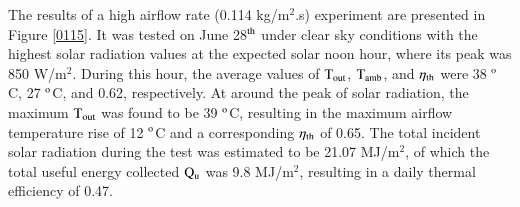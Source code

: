 The results of a high airflow rate (0.114 kg/m$^2$.s) experiment are presented in Figure \ref{0115}. It was tested on June 28$^{\rm{th}}$ under clear sky conditions with the highest solar radiation values at the expected solar noon hour, where its peak was 850 W/m$^2$. During this hour, the average values of $\rm{T_{out}}$, $\rm{T_{amb}}$, and $\eta_{\rm{th}}$ were 38 $^{\rm{o}}$C, 27 $^{\rm{o}}$C, and 0.62, respectively. At around the peak of solar radiation, the maximum $\rm{T_{out}}$ was found to be 39 $^{\rm{o}}$C, resulting in the maximum airflow temperature rise of 12 $^{\rm{o}}$C and a corresponding $\eta_{\rm{th}}$ of 0.65. The total incident solar radiation during the test was estimated to be 21.07 MJ/m$^2$, of which the total useful energy collected $\rm{Q_{u}}$ was 9.8 MJ/m$^2$, resulting in a daily thermal efficiency of 0.47.

